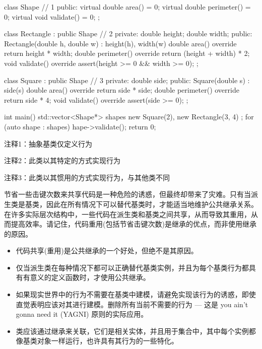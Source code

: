 \begin{cpp}
class Shape { // 1
public:
  virtual double area() = 0;
  virtual double perimeter() = 0;
  virtual void validate() = 0;
};

class Rectangle : public Shape { // 2
private:
  double height;
  double width;
public:
  Rectangle(double h, double w) : height(h), width(w) {}
  double area() override { return height * width; }
  double perimeter() override { return (height + width) * 2; }
  void validate() override { assert(height >= 0 && width >= 0); }
};

class Square : public Shape { // 3
private:
  double side;
public:
  Square(double s) : side(s) {}
  double area() override { return side * side; }
  double perimeter() override { return side * 4; }
  void validate() override { assert(side >= 0); }
};

int main() {
  std::vector<Shape*> shapes { new Square(2), new Rectangle(3, 4) };
  for (auto shape : shapes)
    hape->validate();
  return 0;
}
\end{cpp}

{\footnotesize
注释1：抽象基类仅定义行为

注释2：此类以其特定的方式实现行为

注释3：此类以其惯用的方式实现行为，与其他类不同
}

节省一些击键次数来共享代码是一种危险的诱惑，但最终却带来了灾难。只有当派生类是基类，因此在所有情况下可以替代基类时，才能适当地维护公共继承关系。在许多实际层次结构中，一些代码在派生类和基类之间共享，从而导致其重用，从而提高效率。请记住，代码重用(包括节省击键次数)是继承的优点，而非使用继承的原因。


\begin{itemize}
\item
代码共享(重用)是公共继承的一个好处，但绝不是其原因。

\item
仅当派生类在每种情况下都可以正确替代基类实例，并且为每个基类行为都具有有意义的定义函数时，才使用公共继承。

\item
如果现实世界中的行为不需要在基类中建模，请避免实现该行为的诱惑，即使直觉表明应该对其进行建模。删除所有当前不需要的行为 — 这是 you ain’t gonna need it (YAGNI) 原则的实际应用。

\item
类应该通过继承来关联，它们是相关实体，并且用于集合中，其中每个实例都像基类对象一样运行，也许具有其行为的一些特化。
\end{itemize}












